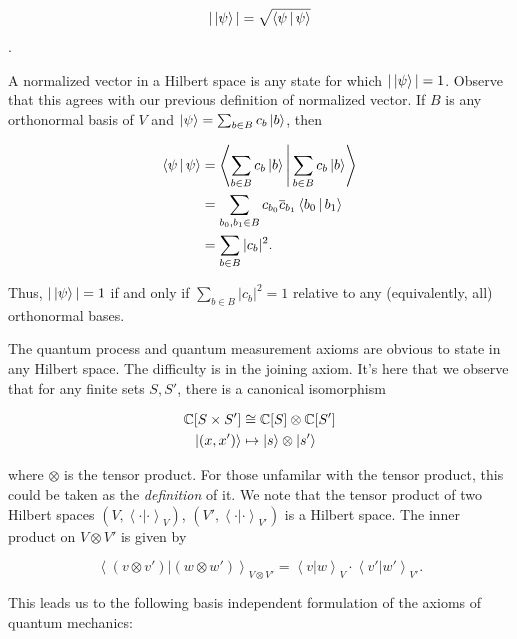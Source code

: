 \documentclass{article}
\theoremstyle{definition}
\newcommand{\CC}{\mathbb{C}}
\newcommand{\0}{\left|0\right>}
\newcommand{\1}{\left|1\right>}
\numberwithin{figure}{section}
\begin{document}
$$|\ket{\psi}|=\sqrt{\Braket{\psi | \psi}}$$.

A normalized vector in a Hilbert space is any state for which $|\ket{\psi}|=1$. Observe that this agrees with our previous definition of normalized vector. If $B$ is any orthonormal basis of $V$ and $\ket{\psi}=\sum_{b\in B}c_b \ket{b}$, then

\begin{align*}
\Braket{\psi|\psi}&=\Braket{\sum_{b\in B}c_b\left|b\right>|\sum_{b\in B}c_b \left|b\right>}\\
&=\sum_{b_0,b_1\in B}c_{b_0}\overline{c}_{b_1}\Braket{b_0 | b_1}\\
&=\sum_{b\in B} |c_b|^2.
\end{align*}

Thus, $|\ket{\psi}|=1$ if and only if $\sum_{b\in B} |c_b|^2=1$ relative to any (equivalently, all) orthonormal bases.

The quantum process and quantum measurement axioms are obvious to state in any Hilbert space. The difficulty is in the joining axiom. It's here that we observe that for any finite sets $S,S'$, there is a canonical isomorphism

\begin{align*}
\CC[S\times S']&\cong \CC[S]\otimes \CC[S']\\
\ket{(x,x')}&\mapsto \ket{s}\otimes \ket{s'}
\end{align*}

where $\otimes$ is the tensor product. For those unfamilar with the tensor product, this could be taken as the \textit{definition} of it. We note that the tensor product of two Hilbert spaces $(V,\left<\cdot|\cdot\right>_V)$, $(V',\left<\cdot|\cdot\right>_{V'})$ is a Hilbert space. The inner product on $V\otimes V'$ is given by

$$\left<(v\otimes v')| (w\otimes w')\right>_{V\otimes V'}=\left<v | w\right>_V\cdot \left<v' | w'\right>_{V'}.$$

This leads us to the following basis independent formulation of the axioms of quantum mechanics:
\end{document}
